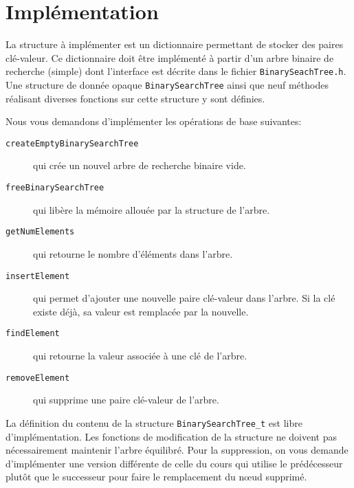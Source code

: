 \documentclass[a4paper,10pt]{article}
\begin{document}
\section{Implémentation}

La structure à implémenter est un dictionnaire permettant de stocker des paires
clé-valeur. Ce dictionnaire doit être implémenté à partir d'un arbre binaire de
recherche (simple) dont l'interface est décrite dans le fichier
\texttt{BinarySeachTree.h}. Une structure de donnée opaque
\texttt{BinarySearchTree} ainsi que neuf méthodes réalisant diverses fonctions
sur cette structure y sont définies.

Nous vous demandons d'implémenter les opérations de base suivantes:
\begin{description}
\item[\texttt{createEmptyBinarySearchTree}] qui crée un nouvel arbre de recherche binaire vide.
\item[\texttt{freeBinarySearchTree}]  qui libère la mémoire allouée par la structure de l'arbre.
\item[\texttt{getNumElements}] qui retourne le nombre d'éléments dans l'arbre.
\item[\texttt{insertElement}] qui permet d'ajouter une nouvelle paire clé-valeur dans l'arbre. Si la clé existe déjà, sa valeur est remplacée par la nouvelle.
\item[\texttt{findElement}] qui retourne la valeur associée à une clé de l'arbre.
\item[\texttt{removeElement}] qui supprime une paire clé-valeur de l'arbre.
\end{description}
La définition du contenu de la structure \texttt{BinarySearchTree\_t}
est libre d'implémentation. Les fonctions de modification de la
structure ne doivent pas nécessairement maintenir l'arbre
équilibré. Pour la suppression, on vous demande d'implémenter une
version différente de celle du cours qui utilise le prédécesseur
plutôt que le successeur pour faire le remplacement du n\oe ud
supprimé.
\end{document}
